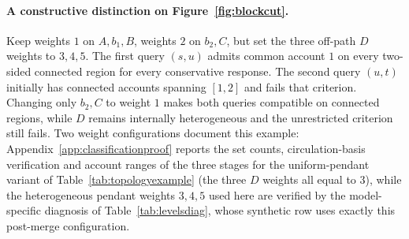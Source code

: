 \paragraph{A constructive distinction on Figure~\ref{fig:blockcut}.}
Keep weights $1$ on $A,b_1,B$, weights $2$ on $b_2,C$, but set the three
off-path $D$ weights to $3,4,5$. The first query $(s,u)$ admits common
account $1$ on every two-sided connected region for every conservative
response. The second query $(u,t)$ initially has connected accounts
spanning $[1,2]$ and fails that criterion. Changing only $b_2,C$ to
weight $1$ makes both queries compatible on connected regions, while
$D$ remains internally heterogeneous and the unrestricted criterion
still fails. Two weight configurations document this example:
Appendix~\ref{app:classificationproof} reports the set counts,
circulation-basis verification and account ranges of the three stages
for the uniform-pendant variant of Table~\ref{tab:topologyexample}
(the three $D$ weights all equal to $3$), while the heterogeneous
pendant weights $3,4,5$ used here are verified by the model-specific
diagnosis of Table~\ref{tab:levelsdiag}, whose synthetic row uses
exactly this post-merge configuration.
